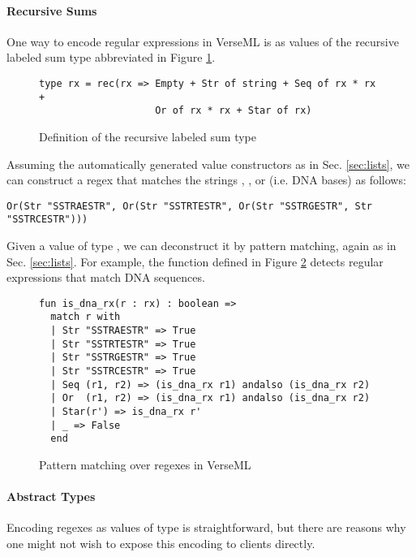 \paragraph{Recursive Sums}
One way to encode regular expressions in VerseML is as values of the recursive labeled sum type abbreviated  in Figure \ref{fig:datatype-rx}.

\begin{figure}[h]
\begin{lstlisting}[numbers=none]
type rx = rec(rx => Empty + Str of string + Seq of rx * rx +
                    Or of rx * rx + Star of rx)
\end{lstlisting}
\caption{Definition of the recursive labeled sum type }
\label{fig:datatype-rx}
\end{figure}
Assuming the automatically generated value constructors as in Sec. \ref{sec:lists}, we can construct a regex that matches the strings , ,  or  (i.e. DNA bases) as follows:
\begin{lstlisting}[numbers=none]
Or(Str "SSTRAESTR", Or(Str "SSTRTESTR", Or(Str "SSTRGESTR", Str "SSTRCESTR")))
\end{lstlisting}

Given a value of type , we can deconstruct it by pattern matching, again as in Sec. \ref{sec:lists}. For example, the function  defined in Figure \ref{fig:is_dna_rx} detects regular expressions that match DNA sequences.

\begin{figure}[h]
\begin{lstlisting}[numbers=none]
fun is_dna_rx(r : rx) : boolean => 
  match r with 
  | Str "SSTRAESTR" => True
  | Str "SSTRTESTR" => True
  | Str "SSTRGESTR" => True
  | Str "SSTRCESTR" => True
  | Seq (r1, r2) => (is_dna_rx r1) andalso (is_dna_rx r2)
  | Or  (r1, r2) => (is_dna_rx r1) andalso (is_dna_rx r2)
  | Star(r') => is_dna_rx r'
  | _ => False 
  end
\end{lstlisting}
\caption{Pattern matching over regexes in VerseML}
\label{fig:is_dna_rx}
\end{figure}


\paragraph{Abstract Types} Encoding regexes as values of type  is straightforward, but there are reasons why one might not wish to expose this encoding to clients directly. 

